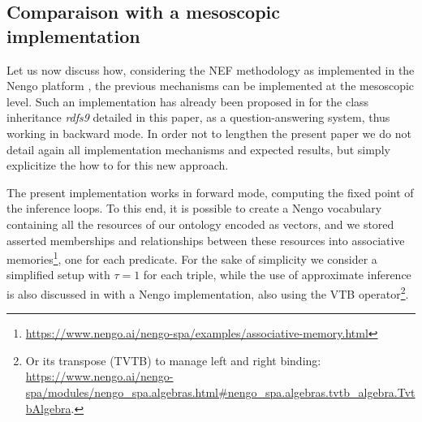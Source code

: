 \documentclass[sn-mathphys]{sn-jnl}
\begin{document}
\subsection{Comparaison with a mesoscopic implementation}\label{nengo}

Let us now discuss how, considering the NEF methodology \cite{eliasmith_how_2013} as implemented in the Nengo platform \cite{bekolay_nengo_2014}, the previous mechanisms can be implemented at the mesoscopic level. Such an implementation has already been proposed in \cite{mercier_ontology_2021} for the class inheritance \textit{rdfs9} detailed in this paper, as a question-answering system, thus working in backward mode. In order not to lengthen the present paper we do not detail again all implementation mechanisms and expected results, but simply explicitize the how to for this new approach. %

The present implementation works in forward mode, computing the fixed point of the inference loops. To this end, it is possible to create a Nengo vocabulary containing all the resources of our ontology encoded as vectors, and we stored asserted memberships and relationships between these resources into associative memories\footnote{\url{https://www.nengo.ai/nengo-spa/examples/associative-memory.html}}, one for each predicate. For the sake of simplicity we consider a simplified setup with $\tau = 1$ for each triple, while the use of approximate inference is also discussed in \cite{mercier_ontology_2021} with a Nengo implementation, also using the VTB operator\footnote{Or its transpose (TVTB) to manage left and right binding: \url{https://www.nengo.ai/nengo-spa/modules/nengo_spa.algebras.html\#nengo_spa.algebras.tvtb_algebra.TvtbAlgebra}.}.
\end{document}
